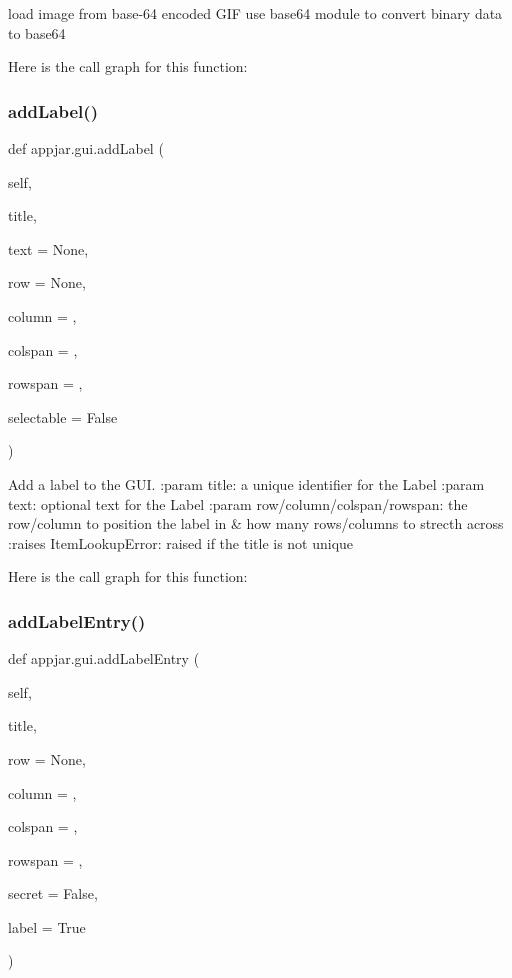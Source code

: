 \begin{DoxyVerb}load image from base-64 encoded GIF
    use base64 module to convert binary data to base64 \end{DoxyVerb}
 Here is the call graph for this function\+:
\mbox{\label{classappjar_1_1gui_aa2108c54eeeb1db272337524494d2a03}} 
\subsubsection{\texorpdfstring{add\+Label()}{addLabel()}}
{\footnotesize\ttfamily def appjar.\+gui.\+add\+Label (\begin{DoxyParamCaption}\item[{}]{self,  }\item[{}]{title,  }\item[{}]{text = {\ttfamily None},  }\item[{}]{row = {\ttfamily None},  }\item[{}]{column = {},  }\item[{}]{colspan = {},  }\item[{}]{rowspan = {},  }\item[{}]{selectable = {\ttfamily False} }\end{DoxyParamCaption})}

\begin{DoxyVerb}Add a label to the GUI.
:param title: a unique identifier for the Label
:param text: optional text for the Label
:param row/column/colspan/rowspan: the row/column to position the label in & how many rows/columns to strecth across
:raises ItemLookupError: raised if the title is not unique
\end{DoxyVerb}
 Here is the call graph for this function\+:
\mbox{\label{classappjar_1_1gui_ae6139882373d7af863c862bd30d0b09c}} 
\subsubsection{\texorpdfstring{add\+Label\+Entry()}{addLabelEntry()}}
{\footnotesize\ttfamily def appjar.\+gui.\+add\+Label\+Entry (\begin{DoxyParamCaption}\item[{}]{self,  }\item[{}]{title,  }\item[{}]{row = {\ttfamily None},  }\item[{}]{column = {},  }\item[{}]{colspan = {},  }\item[{}]{rowspan = {},  }\item[{}]{secret = {\ttfamily False},  }\item[{}]{label = {\ttfamily True} }\end{DoxyParamCaption})}

